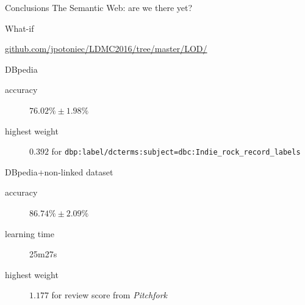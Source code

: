 \documentclass{beamer}
\begin{document}
\begin{frame}{Conclusions}
\centering\Large
The Semantic Web: are we there yet?
\end{frame}

\begin{frame}{What-if}

\url{github.com/jpotoniec/LDMC2016/tree/master/LOD/}
\pause
\begin{block}{DBpedia}
\begin{description}
\item[accuracy] $76.02\%\pm1.98\%$
\item[highest weight] $0.392$ for {\small \texttt{dbp:label/dcterms:subject=dbc:Indie\_rock\_record\_labels}}
\end{description}
\end{block}
\pause
\begin{block}{DBpedia+non-linked dataset}
\begin{description}
\item[accuracy] $86.74\%\pm2.09\%$
\item[learning time] 25m27s
\item[highest weight] $1.177$ for review score from \emph{Pitchfork}
\end{description}
\end{block}
\end{frame}
\end{document}
